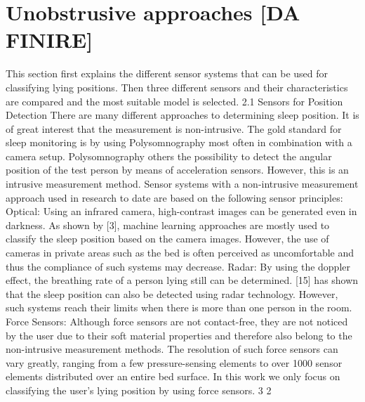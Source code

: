 \section{Unobstrusive approaches [DA FINIRE]}
This section first explains the different sensor systems that can be used for classifying
lying positions. Then three different sensors and their characteristics are compared and
the most suitable model is selected.
2.1 Sensors for Position Detection
There are many different approaches to determining sleep position. It is of great interest
that the measurement is non-intrusive. The gold standard for sleep monitoring is by
using Polysomnography most often in combination with a camera setup. Polysomnography
others the possibility to detect the angular position of the test person by means of acceleration sensors. However, this is an intrusive measurement method. Sensor systems
with a non-intrusive measurement approach used in research to date are based on the
following sensor principles:
Optical: Using an infrared camera, high-contrast images can be generated even in darkness.
As shown by [3], machine learning approaches are mostly used to classify the sleep
position based on the camera images. However, the use of cameras in private areas such
as the bed is often perceived as uncomfortable and thus the compliance of such systems
may decrease.
Radar: By using the doppler effect, the breathing rate of a person lying still can be determined. [15] has shown that the sleep position can also be detected using radar technology.
However, such systems reach their limits when there is more than one person in
the room.
Force Sensors: Although force sensors are not contact-free, they are not noticed by the
user due to their soft material properties and therefore also belong to the non-intrusive
measurement methods. The resolution of such force sensors can vary greatly, ranging from
a few pressure-sensing elements to over 1000 sensor elements distributed over an entire
bed surface.
In this work we only focus on classifying the user's lying position by using force sensors.
3
2
